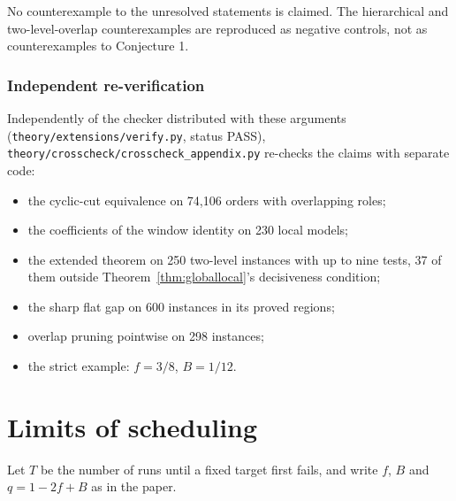 \documentclass[11pt,a4paper]{article}
\theoremstyle{definition}\newtheorem{definition}[theorem]{Definition}
\theoremstyle{remark}\newtheorem{remark}[theorem]{Remark}
\theoremstyle{definition}\newtheorem{xexample}[xtheorem]{Example}\theoremstyle{plain}
\begin{document}
No counterexample to the unresolved statements is claimed. The hierarchical and two-level-overlap counterexamples are reproduced as negative controls, not as counterexamples to Conjecture 1.


\subsubsection*{Independent re-verification}
Independently of the checker distributed with these arguments (\texttt{theory/extensions/verify.py}, status PASS), \texttt{theory/crosscheck/crosscheck\_appendix.py} re-checks the claims with separate code:
\begin{itemize}
\item the cyclic-cut equivalence on 74{,}106 orders with overlapping roles;
\item the coefficients of the window identity on 230 local models;
\item the extended theorem on 250 two-level instances with up to nine tests, 37 of them outside Theorem~\ref{thm:globallocal}'s decisiveness condition;
\item the sharp flat gap on 600 instances in its proved regions;
\item overlap pruning pointwise on 298 instances;
\item the strict example: $f=3/8$, $B=1/12$.
\end{itemize}

\section{Limits of scheduling}\label{sec:limits}
Let $T$ be the number of runs until a fixed target first fails, and write $f$, $B$ and $q=1-2f+B$ as in the paper.
\end{document}
